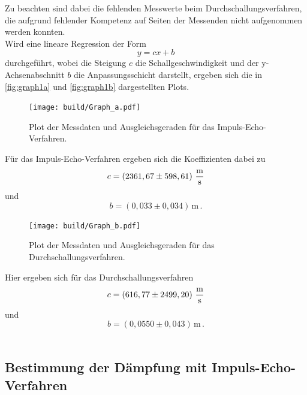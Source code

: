 Zu beachten sind dabei die fehlenden Messwerte beim Durchschallungsverfahren, die aufgrund fehlender Kompetenz auf Seiten der Messenden nicht aufgenommen werden konnten. \\

Wird eine lineare Regression der Form
\begin{equation*}
    y = c x + b
\end{equation*}
durchgeführt, wobei die Steigung $c$ die Schallgeschwindigkeit und der y-Achsenabschnitt $b$ die Anpassungsschicht darstellt, ergeben sich die in \autoref{fig:graph1a} und \autoref{fig:graph1b} dargestellten Plots.
    
\begin{figure}[H]
        \centering
        \texttt{[image: build/Graph\_a.pdf]} 
        \caption{Plot der Messdaten und Ausgleichsgeraden für das Impuls-Echo-Verfahren.}
        \label{fig:graph1a}
\end{figure}

Für das Impuls-Echo-Verfahren ergeben sich die Koeffizienten dabei zu
\begin{equation*}
    c = \left( 2361,67 \pm 598,61 \right) \,\unit{\frac{\meter}{\second}}
\end{equation*}
und
\begin{equation*}
    b = \left( 0,033 \pm 0,034 \right) \,\unit{\meter} \,.
\end{equation*}

\begin{figure}[H]
    \centering
    \texttt{[image: build/Graph\_b.pdf]} 
    \caption{Plot der Messdaten und Ausgleichsgeraden für das Durchschallungsverfahren.}
    \label{fig:graph1b}
\end{figure}

Hier ergeben sich für das Durchschallungsverfahren
\begin{equation*}%
    c = \left( 616,77 \pm 2499,20 \right) \,\unit{\frac{\meter}{\second}}
\end{equation*}
und
\begin{equation*}%
    b = \left( 0,0550 \pm 0,043 \right)\,\unit{\meter} \,.
\end{equation*} \\


\subsection{Bestimmung der Dämpfung mit Impuls-Echo-Verfahren}

